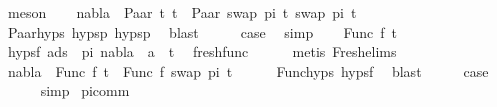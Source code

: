 \begin{isabellebody}
\ meson{\isacharplus}{\kern0pt}\isanewline
\ \ \isamarkupfalse%
\ {\isachardoublequoteopen}nabla\ {\isasymturnstile}\ Paar\ t{}\ t{}\ {\isasymapprox}\ Paar\ {\isacharparenleft}{\kern0pt}swap\ pi\ t{}{\isacharparenright}{\kern0pt}\ {\isacharparenleft}{\kern0pt}swap\ pi\ t{}{\isacharparenright}{\kern0pt}{\isachardoublequoteclose}\isanewline
\ \ \ \ \isamarkupfalse%
\ Paar{\isachardot}{\kern0pt}hyps{\isacharparenleft}{\kern0pt}{}{\isacharcomma}{\kern0pt}{}{\isacharparenright}{\kern0pt}\ hypsp{}\ hypsp{}\ \isamarkupfalse%
\ blast\isanewline
\ \ \isamarkupfalse%
\ \isamarkupfalse%
\ {\isacharquery}{\kern0pt}case\ \isamarkupfalse%
\ simp\isanewline
{}\isamarkupfalse%
\isanewline
\ \ \isamarkupfalse%
\ {\isacharparenleft}{\kern0pt}Func\ f\ t{\isacharprime}{\kern0pt}{\isacharparenright}{\kern0pt}\isanewline
\ \ \isamarkupfalse%
\ \isamarkupfalse%
\ hypsf{\isacharcolon}{\kern0pt}\ {\isachardoublequoteopen}{\isasymforall}a{\isasymin}ds\ {\isacharbrackleft}{\kern0pt}{\isacharbrackright}{\kern0pt}\ pi{\isachardot}{\kern0pt}\ nabla\ {\isasymturnstile}\ a\ {\isasymsharp}\ t{\isacharprime}{\kern0pt}{\isachardoublequoteclose}\ \isamarkupfalse%
\ fresh{\isacharunderscore}{\kern0pt}func\isanewline
\ \ \ \ \isamarkupfalse%
\ {\isacharparenleft}{\kern0pt}metis\ Fresh{\isacharunderscore}{\kern0pt}elims{\isacharparenleft}{\kern0pt}{}{\isacharparenright}{\kern0pt}{\isacharparenright}{\kern0pt}\isanewline
\ \ \isamarkupfalse%
\ {\isachardoublequoteopen}nabla\ {\isasymturnstile}\ Func\ f\ t{\isacharprime}{\kern0pt}\ {\isasymapprox}\ Func\ f\ {\isacharparenleft}{\kern0pt}swap\ pi\ t{\isacharprime}{\kern0pt}{\isacharparenright}{\kern0pt}{\isachardoublequoteclose}\isanewline
\ \ \ \ \isamarkupfalse%
\ Func{\isachardot}{\kern0pt}hyps\ hypsf\ \isamarkupfalse%
\ blast\isanewline
\ \ \isamarkupfalse%
\ \isamarkupfalse%
\ {\isacharquery}{\kern0pt}case\isanewline
\ \ \ \ \isamarkupfalse%
\ simp\isanewline
{}\isamarkupfalse%
%
\endisatagproof
{\isafoldproof}%
%
\isadelimproof
\isanewline
%
\endisadelimproof
\isanewline
{}\isamarkupfalse%
\ pi{\isacharunderscore}{\kern0pt}comm{\isacharcolon}{\kern0pt}\ \isanewline

\end{isabellebody}
